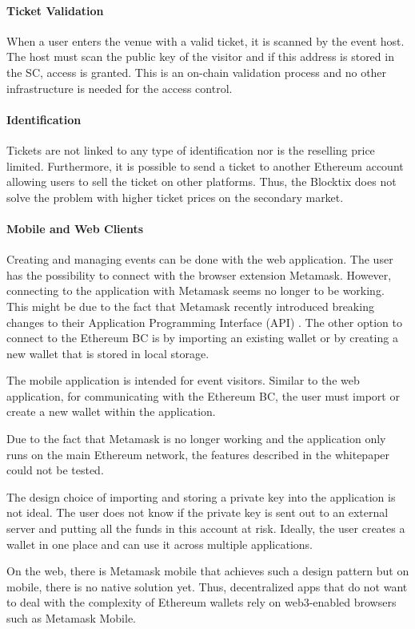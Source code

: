 \paragraph{Ticket Validation}
When a user enters the venue with a valid ticket, it is scanned by the event host. The host must scan the public key of the visitor and if this address is stored in the SC, access is granted. This is an on-chain validation process and no other infrastructure is needed for the access control.

\paragraph{Identification}
Tickets are not linked to any type of identification nor is the reselling price limited. Furthermore, it is possible to send a ticket to another Ethereum account allowing users to sell the ticket on other platforms. Thus, the Blocktix does not solve the problem with higher ticket prices on the secondary market. 

\paragraph{Mobile and Web Clients}
Creating and managing events can be done with the web application. The user has the possibility to connect with the browser extension Metamask. However, connecting to the application with Metamask seems no longer to be working. This might be due to the fact that Metamask recently introduced breaking changes to their Application Programming Interface (API) \cite{metamask-breaking-changes}. The other option to connect to the Ethereum BC is by importing an existing wallet or by creating a new wallet that is stored in local storage. 

The mobile application is intended for event visitors. Similar to the web application, for communicating with the Ethereum BC, the user must import or create a new wallet within the application.

Due to the fact that Metamask is no longer working and the application only runs on the main Ethereum network, the features described in the whitepaper could not be tested.

The design choice of importing and storing a private key into the application is not ideal. The user does not know if the private key is sent out to an external server and putting all the funds in this account at risk. Ideally, the user creates a wallet in one place and can use it across multiple applications.

On the web, there is Metamask mobile that achieves such a design pattern but on mobile, there is no native solution yet. Thus, decentralized apps that do not want to deal with the complexity of Ethereum wallets rely on web3-enabled browsers such as Metamask Mobile. 
